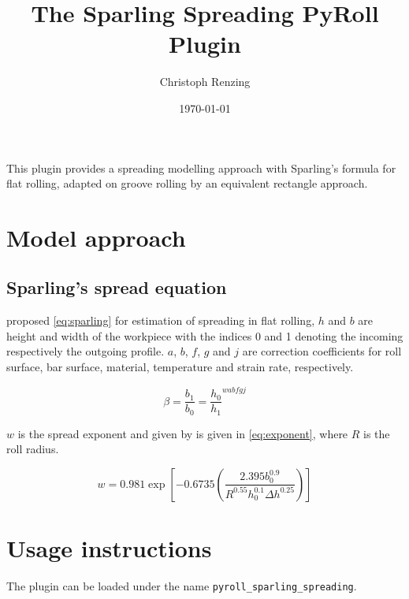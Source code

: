 \documentclass[11pt]{PyRollDocs}
\begin{document}
    \title{The Sparling Spreading PyRoll Plugin}
    \author{Christoph Renzing}
    \date{\today}

    \maketitle

    This plugin provides a spreading modelling approach with Sparling's formula for flat rolling, adapted on groove rolling by an equivalent rectangle approach.


    \section{Model approach}\label{sec:model-approach}

    \subsection{Sparling's spread equation}\label{subsec:sparling's-spread-equation}

    \textcite{Sparling1961} proposed \autoref{eq:sparling} for estimation of spreading in flat rolling,
    $h$ and $b$ are height and width of the workpiece with the indices 0 and 1 denoting the incoming respectively the outgoing profile.
    $a$, $b$, $f$, $g$ and $j$ are correction coefficients for roll surface, bar surface, material, temperature and strain rate, respectively.

    \begin{equation}
        \beta = \frac{b_1}{b_0} =  \frac{h_0}{h_1} ^{w a b f g j}
        \label{eq:sparling}
    \end{equation}


    $w$ is the spread exponent and given by \textcite{Sparling1961} is given in \autoref{eq:exponent}, where $R$ is the roll radius.

    \begin{equation}
        w = 0.981 \exp \left[ -0.6735 \left( \frac{2.395 b_0^{0.9}}{R^{0.55} h_0^{0.1} \Delta h^{0.25} } \right) \right]
        \label{eq:exponent}
    \end{equation}


    \section{Usage instructions}\label{sec:usage-instructions}

    The plugin can be loaded under the name \texttt{pyroll\_sparling\_spreading}.
\end{document}
